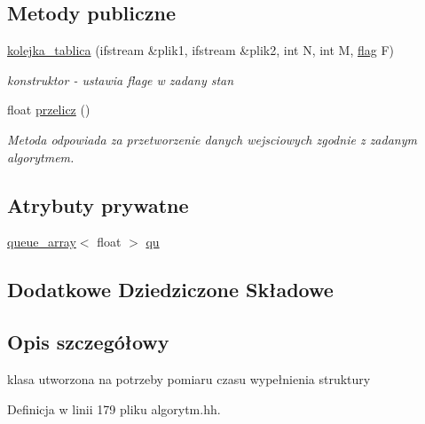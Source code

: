 \subsection*{Metody publiczne}
\begin{DoxyCompactItemize}
\item 
\hyperlink{classkolejka__tablica_aa99b89749fcd8c780882ebbe089cad0f}{kolejka\-\_\-tablica} (ifstream \&plik1, ifstream \&plik2, int N, int M, \hyperlink{stos_8hh_a7847560c748814fd3070e9149a9578bd}{flag} F)
\begin{DoxyCompactList}\small\item\em konstruktor -\/ ustawia flage w zadany stan \end{DoxyCompactList}\item 
float \hyperlink{classkolejka__tablica_aad6baa28ce61111666e70df7d6ac4f86}{przelicz} ()
\begin{DoxyCompactList}\small\item\em Metoda odpowiada za przetworzenie danych wejsciowych zgodnie z zadanym algorytmem. \end{DoxyCompactList}\end{DoxyCompactItemize}
\subsection*{Atrybuty prywatne}
\begin{DoxyCompactItemize}
\item 
\hyperlink{classqueue__array}{queue\-\_\-array}$<$ float $>$ \hyperlink{classkolejka__tablica_a7fd15c7c7a0fa3649042ec634b2b8d4f}{qu}
\end{DoxyCompactItemize}
\subsection*{Dodatkowe Dziedziczone Składowe}


\subsection{Opis szczegółowy}
klasa utworzona na potrzeby pomiaru czasu wypełnienia struktury 

Definicja w linii 179 pliku algorytm.\-hh.



